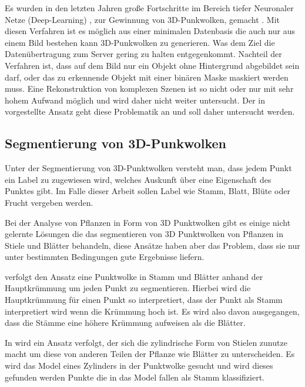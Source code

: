 \documentclass[12pt,titlepage, twoside]{article}
\begin{document}
Es wurden in den letzten Jahren große Fortschritte im Bereich tiefer Neuronaler Netze (Deep-Learning) \cite{lecun2015deep}, zur Gewinnung von 3D-Punkwolken, gemacht \cite{fan2016point} \cite{tatarchenko2017octree} \cite{wang2018pixel2mesh}. 
Mit diesen Verfahren ist es möglich aus einer minimalen Datenbasis die auch nur aus einem Bild bestehen kann 3D-Punkwolken zu generieren. Was dem Ziel die Datenübertragung zum Server gering zu halten entgegenkommt.
Nachteil der Verfahren ist, dass auf dem Bild nur ein Objekt ohne Hintergrund abgebildet sein darf, oder das zu erkennende Objekt mit einer binären Maske maskiert werden muss.
Eine Rekonstruktion von komplexen Szenen ist so nicht oder nur mit sehr hohem Aufwand möglich \cite{rs11222644} und wird daher nicht weiter untersucht. 
Der in \cite{rs11222644} vorgestellte Ansatz geht diese Problematik an und soll daher untersucht werden.

\subsection{Segmentierung von 3D-Punkwolken}
\label{sec:stand:segmentierung}

Unter der Segmentierung von 3D-Punktwolken versteht man, dass jedem Punkt ein Label zu zugewiesen wird, welches Auskunft über eine Eigenschaft des Punktes gibt. Im Falle dieser Arbeit sollen Label wie Stamm, Blatt, Blüte oder Frucht vergeben werden.

Bei der Analyse von Pflanzen in Form von 3D Punktwolken gibt es einige nicht gelernte Lösungen \cite{ThreeBasics} \cite{ModelBased} die das segmentieren von 3D Punktwolken von Pflanzen in Stiele und Blätter behandeln, 
diese Ansätze haben aber das Problem, dass sie nur unter bestimmten Bedingungen gute Ergebnisse liefern.

\cite{ThreeBasics} verfolgt den Ansatz eine Punktwolke in Stamm und Blätter anhand der Hauptkrümmung um jeden Punkt zu segmentieren. 
Hierbei wird die Hauptkrümmung für einen Punkt so interpretiert, dass der Punkt als Stamm interpretiert wird wenn die Krümmung hoch ist. 
Es wird also davon ausgegangen, dass die Stämme eine höhere Krümmung aufweisen als die Blätter. 

In \cite{ModelBased}  wird ein Ansatz verfolgt, der sich die zylindrische Form von Stielen zunutze macht um diese von anderen Teilen der Pflanze wie Blätter zu unterscheiden. 
Es wird das Model eines Zylinders in der Punktwolke gesucht und wird dieses gefunden werden Punkte die in das Model fallen als Stamm klassifiziert.
\end{document}
